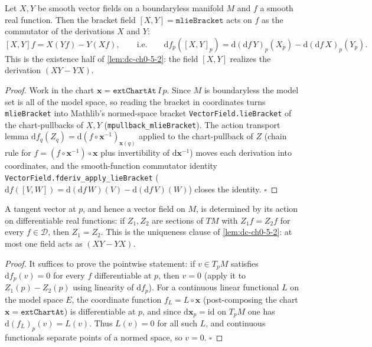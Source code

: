 \begin{lemma}
  \label{lem:dc-ch0-5-2-commutator}
  \leanok
  Let $X,Y$ be smooth vector fields on a boundaryless manifold $M$ and $f$ a smooth
  real function. Then the bracket field $[X,Y]=\texttt{mlieBracket}$ acts on $f$ as the
  commutator of the derivations $X$ and $Y$:
  $$
  [X,Y]f = X(Yf)-Y(Xf), \qquad\text{i.e.}\qquad
  \mathrm{d}f_p([X,Y]_p) = \mathrm{d}(\mathrm{d}f\,Y)_p(X_p)-\mathrm{d}(\mathrm{d}f\,X)_p(Y_p).
  $$
  This is the existence half of \cref{lem:dc-ch0-5-2}: the field $[X,Y]$ realizes the
  derivation $(XY-YX)$.
\end{lemma}
\begin{proof}
  \leanok
  Work in the chart $\mathbf{x}=\texttt{extChartAt}\,I\,p$. Since $M$ is boundaryless the
  model set is all of the model space, so reading the bracket in coordinates turns
  \texttt{mlieBracket} into Mathlib's normed-space bracket \texttt{VectorField.lieBracket}
  of the chart-pullbacks of $X,Y$ (\texttt{mpullback\_mlieBracket}). The action transport
  lemma $\mathrm{d}f_q(Z_q)=\mathrm{d}(f\circ\mathbf{x}^{-1})_{\mathbf{x}(q)}$ applied to the
  chart-pullback of $Z$ (chain rule for $f=(f\circ\mathbf{x}^{-1})\circ\mathbf{x}$ plus
  invertibility of $\mathrm{d}\mathbf{x}^{-1}$) moves each derivation into coordinates, and the
  smooth-function commutator identity \texttt{VectorField.fderiv\_apply\_lieBracket}
  ($\mathrm{d}f([V,W])=\mathrm{d}(\mathrm{d}f\,W)(V)-\mathrm{d}(\mathrm{d}f\,V)(W)$) closes the
  identity. $\square$
\end{proof}

\begin{lemma}
  \label{lem:dc-ch0-5-2-unique}
  \leanok
  A tangent vector at $p$, and hence a vector field on $M$, is determined by its
  action on differentiable real functions: if $Z_1,Z_2$ are sections of $TM$ with
  $Z_1f=Z_2f$ for every $f\in\mathcal{D}$, then $Z_1=Z_2$. This is the uniqueness
  clause of \cref{lem:dc-ch0-5-2}: at most one field acts as $(XY-YX)$.
\end{lemma}
\begin{proof}
  \leanok
  It suffices to prove the pointwise statement: if $v\in T_pM$ satisfies
  $\mathrm{d}f_p(v)=0$ for every $f$ differentiable at $p$, then $v=0$
  (apply it to $Z_1(p)-Z_2(p)$ using linearity of $\mathrm{d}f_p$). For a
  continuous linear functional $L$ on the model space $E$, the coordinate function
  $f_L=L\circ\mathbf{x}$ (post-composing the chart $\mathbf{x}=\texttt{extChartAt}$)
  is differentiable at $p$, and since $\mathrm{d}\mathbf{x}_p=\mathrm{id}$ on
  $T_pM$ one has $\mathrm{d}(f_L)_p(v)=L(v)$. Thus $L(v)=0$ for all such $L$, and
  continuous functionals separate points of a normed space, so $v=0$. $\square$
\end{proof}

